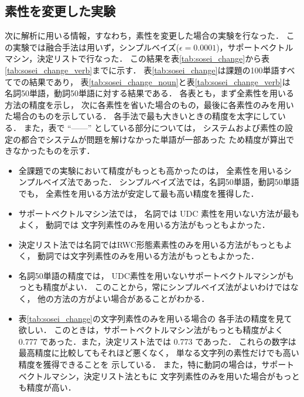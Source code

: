 \subsection{素性を変更した実験}
\label{sec:experiment2}

次に解析に用いる情報，すなわち，素性を変更した場合の実験を行なった．
この実験では融合手法は用いず，シンプルベイズ($\epsilon=0.0001$)，サポートベクトルマシン，決定リストで行なった．
この結果を表\ref{tab:sosei_change}から表\ref{tab:sosei_change_verb}までに示す．
表\ref{tab:sosei_change}は課題の100単語すべてでの結果であり，
表\ref{tab:sosei_change_noun}と表\ref{tab:sosei_change_verb}は
名詞50単語，動詞50単語に対する結果である．
各表とも，まず全素性を用いる方法の精度を示し，
次に各素性を省いた場合のもの，最後に各素性のみを用いた場合のものを示している．
各手法で最も大きいときの精度を太字にしている．
また，表で ``------'' としている部分については，
システムおよび素性の設定の都合でシステムが問題を解けなかった単語が一部あった
ため精度が算出できなかったものを示す．

\begin{itemize}
\item 
  全課題での実験において精度がもっとも高かったのは，
  全素性を用いるシンプルベイズ法であった．
  シンプルベイズ法では，名詞50単語，動詞50単語でも，
  全素性を用いる方法が安定して最も高い精度を獲得した．

\item 
  サポートベクトルマシン法では，
  名詞では UDC 素性を用いない方法が最もよく，
  動詞では 文字列素性のみを用いる方法がもっともよかった．

\item 
  決定リスト法では名詞ではRWC形態素素性のみを用いる方法がもっともよく，
  動詞では文字列素性のみを用いる方法がもっともよかった．

\item 
  名詞50単語の精度では，
  UDC素性を用いないサポートベクトルマシンがもっとも精度がよい．
  このことから，常にシンプルベイズ法がよいわけではなく，
  他の方法の方がよい場合があることがわかる．

\item 
  表\ref{tab:sosei_change}の文字列素性のみを用いる場合の
  各手法の精度を見て欲しい．
  このときは，サポートベクトルマシン法がもっとも精度がよく
  0.777 であった．また，決定リスト法では 0.773 であった．
  これらの数字は最高精度に比較してもそれほど悪くなく，
  単なる文字列の素性だけでも高い精度を獲得できることを
  示している．
  また，特に動詞の場合は，サポートベクトルマシン，決定リスト法ともに
  文字列素性のみを用いた場合がもっとも精度が高い．

\end{itemize}


